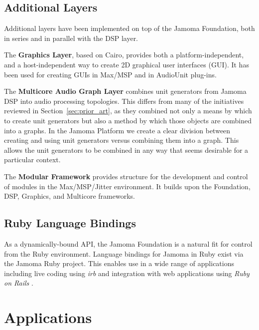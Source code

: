 \documentclass[twoside,10pt]{article}
\begin{document}


\subsection{Additional Layers} %

Additional layers have been implemented on top of the Jamoma Foundation, both in series and in parallel with the DSP layer.  

The \textbf{Graphics Layer}\cite{web10}, based on Cairo\cite{web11}, provides both a platform-independent, and a host-independent way to create 2D graphical user interfaces (GUI). It has been used for creating GUIs in Max/MSP and in AudioUnit plug-ins.

The \textbf{Multicore Audio Graph Layer}\cite{web12} combines unit generators from Jamoma DSP into audio processing topologies.  This differs from many of the initiatives reviewed in Section~\ref{sec:prior_art}, as they combined not only a means by which to create unit generators but also a method by which those objects are combined into a graphs.  In the Jamoma Platform we create a clear division between creating and using unit generators versus combining them into a graph.  This allows the unit generators to be combined in any way that seems desirable for a particular context.

The \textbf{Modular Framework}\cite{web13} provides structure for the development and control of modules in the Max/MSP/Jitter environment.  It builds upon the Foundation, DSP, Graphics, and Multicore frameworks.



\subsection{Ruby Language Bindings} %

As a dynamically-bound API, the Jamoma Foundation is a natural fit for control from the Ruby environment.  Language bindings for Jamoma in Ruby exist via the Jamoma Ruby project\cite{web14}.  This enables use in a wide range of applications including live coding using \emph{irb} \cite{web15} and integration with web applications using \emph{Ruby on Rails} \cite{web16}.




\section{Applications} %
\end{document}
